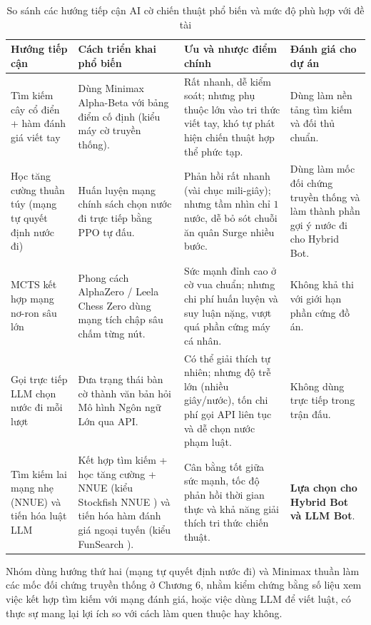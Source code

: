 \begin{table}[H]
    \centering
    \caption{So sánh các hướng tiếp cận AI cờ chiến thuật phổ biến và mức độ phù hợp với đề tài}
    \label{tab:ai_approaches_compare}
    \begin{tabularx}{\textwidth}{|L{2.8cm}|Y|Y|L{2.8cm}|}
        \hline
        \textbf{Hướng tiếp cận} & \textbf{Cách triển khai phổ biến} & \textbf{Ưu và nhược điểm chính} & \textbf{Đánh giá cho dự án} \\
        \hline
        Tìm kiếm cây cổ điển + hàm đánh giá viết tay & Dùng Minimax Alpha-Beta với bảng điểm cố định (kiểu máy cờ truyền thống). & Rất nhanh, dễ kiểm soát; nhưng phụ thuộc lớn vào tri thức viết tay, khó tự phát hiện chiến thuật hợp thể phức tạp. & Dùng làm nền tảng tìm kiếm và đối thủ chuẩn. \\
        \hline
        Học tăng cường thuần túy (mạng tự quyết định nước đi) & Huấn luyện mạng chính sách chọn nước đi trực tiếp bằng PPO tự đấu. & Phản hồi rất nhanh (vài chục mili-giây); nhưng tầm nhìn chỉ $1$ nước, dễ bỏ sót chuỗi ăn quân Surge nhiều bước. & Dùng làm mốc đối chứng truyền thống và làm thành phần gợi ý nước đi cho Hybrid Bot. \\
        \hline
        MCTS kết hợp mạng nơ-ron sâu lớn & Phong cách AlphaZero / Leela Chess Zero dùng mạng tích chập sâu chấm từng nút. & Sức mạnh đỉnh cao ở cờ vua chuẩn; nhưng chi phí huấn luyện và suy luận nặng, vượt quá phần cứng máy cá nhân. & Không khả thi với giới hạn phần cứng đồ án. \\
        \hline
        Gọi trực tiếp LLM chọn nước đi mỗi lượt & Đưa trạng thái bàn cờ thành văn bản hỏi Mô hình Ngôn ngữ Lớn qua API. & Có thể giải thích tự nhiên; nhưng độ trễ lớn (nhiều giây/nước), tốn chi phí gọi API liên tục và dễ chọn nước phạm luật. & Không dùng trực tiếp trong trận đấu. \\
        \hline
        Tìm kiếm lai mạng nhẹ (NNUE) và tiến hóa luật LLM & Kết hợp tìm kiếm + học tăng cường + NNUE (kiểu Stockfish NNUE \cite{nnue}) và tiến hóa hàm đánh giá ngoại tuyến (kiểu FunSearch \cite{funsearch}). & Cân bằng tốt giữa sức mạnh, tốc độ phản hồi thời gian thực và khả năng giải thích tri thức chiến thuật. & \textbf{Lựa chọn cho Hybrid Bot và LLM Bot}. \\
        \hline
    \end{tabularx}
\end{table}

Nhóm dùng hướng thứ hai (mạng tự quyết định nước đi) và Minimax thuần làm các mốc đối chứng truyền thống ở Chương 6, nhằm kiểm chứng bằng số liệu xem việc kết hợp tìm kiếm với mạng đánh giá, hoặc việc dùng LLM để viết luật, có thực sự mang lại lợi ích so với cách làm quen thuộc hay không.

